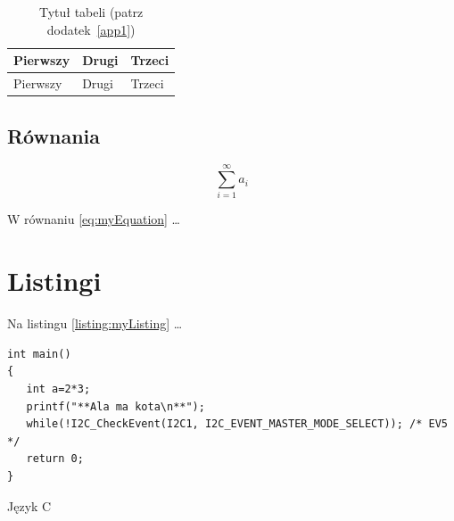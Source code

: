 \begin{table}
	\centering\caption{Tytuł tabeli (patrz dodatek~\ref{app1}) \label{table:table1}}
	\begin{tabular}{|l|l|l|}%
		\hline
		Pierwszy & Drugi & Trzeci \\
		\hline
		Pierwszy & Drugi & Trzeci \\
		\hline
	\end{tabular}
\end{table}

\subsection{Równania}

\begin{equation}
	\sum_{i=1}^{\infty}a_i
	\label{eq:myEquation}
\end{equation}

W równaniu \ref{eq:myEquation} \dots

\section{Listingi}

Na listingu \ref{listing:myListing} \dots

\begin{listing}
	\begin{verbatim}  
int main()
{
   int a=2*3;
   printf("**Ala ma kota\n**");
   while(!I2C_CheckEvent(I2C1, I2C_EVENT_MASTER_MODE_SELECT)); /* EV5 */
   return 0;
}
\end{verbatim}
	\caption{Język C} \label{listing:myListing}
\end{listing}

